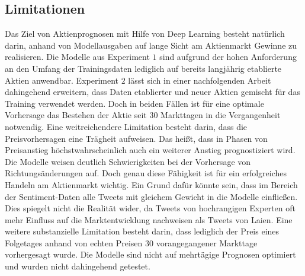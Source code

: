 \subsection{Limitationen}\label{sec:evaluierung_limits}
Das Ziel von Aktienprognosen mit Hilfe von Deep Learning besteht natürlich darin, anhand von Modellausgaben auf lange Sicht am Aktienmarkt Gewinne zu realisieren. Die Modelle aus Experiment $1$ sind aufgrund der hohen Anforderung an den Umfang der Trainingsdaten lediglich auf bereits langjährig etablierte Aktien anwendbar. Experiment $2$ lässt sich in einer nachfolgenden Arbeit dahingehend erweitern, dass Daten etablierter und neuer Aktien gemischt für das Training verwendet werden. Doch in beiden Fällen ist für eine optimale Vorhersage das Bestehen der Aktie seit 30 Markttagen in die Vergangenheit notwendig. 
Eine weitreichendere Limitation besteht darin, dass die Preisvorhersagen eine Trägheit aufweisen. Das heißt, dass in Phasen von Preisanstieg höchstwahrscheinlich auch ein weiterer Anstieg prognostiziert wird. Die Modelle weisen deutlich Schwierigkeiten bei der Vorhersage von Richtungsänderungen auf. Doch genau diese Fähigkeit ist für ein erfolgreiches Handeln am Aktienmarkt wichtig. Ein Grund dafür könnte sein, dass im Bereich der Sentiment-Daten alle Tweets mit gleichem Gewicht in die Modelle einfließen. Dies spiegelt nicht die Realität wider, da Tweets von hochrangigen Experten oft mehr Einfluss auf die Marktentwicklung nachweisen als Tweets von Laien.
Eine weitere substanzielle Limitation besteht darin, dass lediglich der Preis eines Folgetages anhand von echten Preisen 30 vorangegangener Markttage vorhergesagt wurde. Die Modelle sind nicht auf mehrtägige Prognosen optimiert und wurden nicht dahingehend getestet.  

